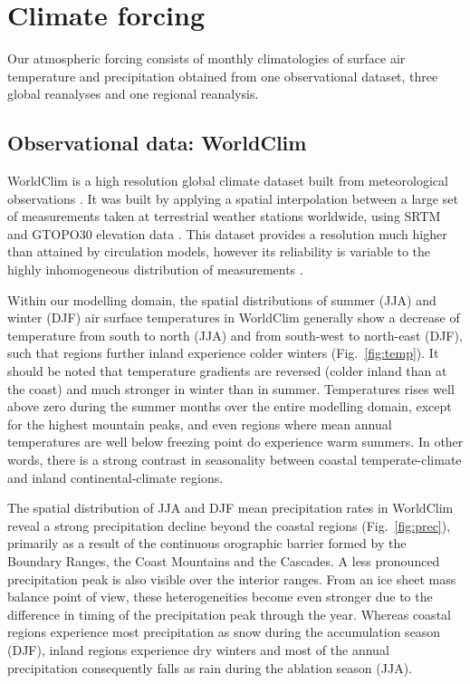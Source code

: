 \section{Climate forcing}
\label{sec:climate}

Our atmospheric forcing consists of monthly climatologies of surface air temperature and precipitation obtained from one observational dataset, three global reanalyses and one regional reanalysis.

\subsection{Observational data: WorldClim}

WorldClim is a high resolution global climate dataset built from meteorological observations \citep{data:worldclim}. It was built by applying a spatial interpolation between a large set of measurements taken at terrestrial weather stations worldwide, using SRTM \citep{data:srtm} and GTOPO30 elevation data \citep{data:gtopo30}. This dataset provides a resolution much higher than attained by circulation models, however its reliability is variable to the highly inhomogeneous distribution of measurements \citep{data:worldclim}.

Within our modelling domain, the spatial distributions of summer (JJA) and winter (DJF) air surface temperatures in WorldClim generally show a decrease of temperature from south to north (JJA) and from south-west to north-east (DJF), such that regions further inland experience colder winters (Fig.~\ref{fig:temp}). It should be noted that temperature gradients are reversed (colder inland than at the coast) and much stronger in winter than in summer. Temperatures rises well above zero during the summer months over the entire modelling domain, except for the highest mountain peaks, and even regions where mean annual temperatures are well below freezing point do experience warm summers. In other words, there is a strong contrast in seasonality between coastal temperate-climate and inland continental-climate regions.

The spatial distribution of JJA and DJF mean precipitation rates in WorldClim reveal a strong precipitation decline beyond the coastal regions (Fig.~\ref{fig:prec}), primarily as a result of the continuous orographic barrier formed by the Boundary Ranges, the Coast Mountains and the Cascades. A less pronounced precipitation peak is also visible over the interior ranges. From an ice sheet mass balance point of view, these heterogeneities become even stronger due to the difference in timing of the precipitation peak through the year. Whereas coastal regions experience most precipitation as snow during the accumulation season (DJF), inland regions experience dry winters and most of the annual precipitation consequently falls as rain during the ablation season (JJA).

